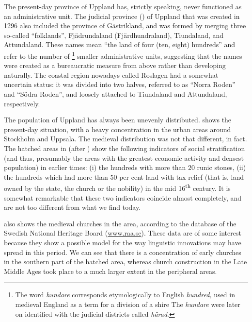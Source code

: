The present-day province of Uppland has, strictly speaking, never functioned as an administrative unit. The judicial province () of Uppland that was created in 1296 also included the province of Gästrikland, and was formed by merging three so-called “folklands”, Fjädrundaland (Fjärdhundraland), Tiundaland, and Attundaland. These names mean “the land of four (ten, eight) hundreds” and refer to the number of \textstyleLinguisticExample{,}\footnote{ The word \textit{hundare} corresponds etymologically to English \textit{hundred}\textit{,} used in medieval England as a term for a division of a shire The \textit{hundare} were later on identified with the judicial districts called \textit{härad}.} smaller administrative units, suggesting that the names were created as a bureaucratic measure from above rather than developing naturally. The coastal region nowadays called Roslagen had a somewhat uncertain status: it was divided into two halves, referred to as “Norra Roden” and “Södra Roden”, and loosely attached to Tiundaland and Attundaland, respectively. 

The population of Uppland has always been unevenly distributed.  shows the present-day situation, with a heavy concentration in the urban areas around Stockholm and Uppsala. The medieval distribution was not that different, in fact. The hatched areas in  (after \citet{Broberg1990}) show the following indicators of social stratification (and thus, presumably the areas with the greatest economic activity and densest population) in earlier times: (i) the hundreds with more than 20 runic stones, (ii) the hundreds which had more than 50 per cent land with tax-relief (that is, land owned by the state, the church or the nobility) in the mid 16\textsuperscript{th} century. It is somewhat remarkable that these two indicators coincide almost completely, and are not too different from what we find today. 

 also shows the medieval churches in the area, according to the database of the Swedish National Heritage Board (\href{http://www.raa.se}{{www.raa.se}}). These data are of some interest because they show a possible model for the way linguistic innovations may have spread in this period. We can see that there is a concentration of early churches in the southern part of the hatched area, whereas church construction in the Late Middle Ages took place to a much larger extent in the peripheral areas.

